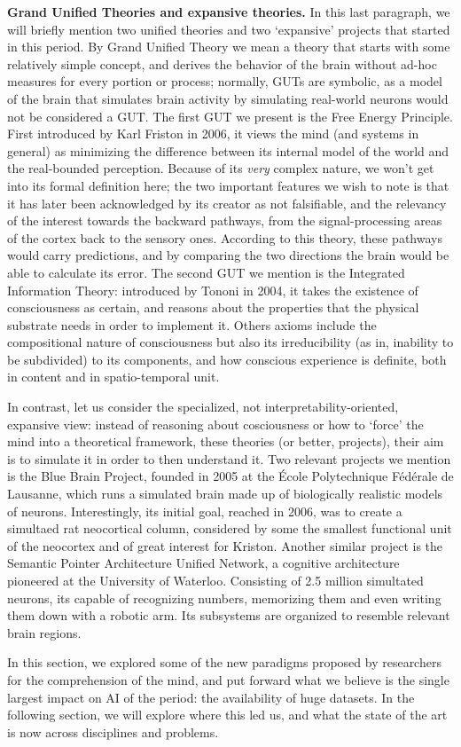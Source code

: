 \documentclass[../main.tex]{subfiles}
\begin{document}
\vspace{4pt}
\textbf{Grand Unified Theories and expansive theories.} In this last paragraph, we will briefly mention two unified theories and two `expansive' projects that started in this period. By Grand Unified Theory we mean a theory that starts with some relatively simple concept, and derives the behavior of the brain without ad-hoc measures for every portion or process; normally, GUTs are symbolic, as a model of the brain that simulates brain activity by simulating real-world neurons would not be considered a GUT. The first GUT we present is the Free Energy Principle. First introduced by Karl Friston in 2006\cite{fristonFreeEnergyPrinciple2006}, it views the mind (and systems in general) as minimizing the difference between its internal model of the world and the real-bounded perception. Because of its \textit{very} complex nature, we won't get into its formal definition here; the two important features we wish to note is that it has later been acknowledged by its creator as not falsifiable, and the relevancy of the interest towards the backward pathways, from the signal-processing areas of the cortex back to the sensory ones. According to this theory, these pathways would carry predictions, and by comparing the two directions the brain would be able to calculate its error. The second GUT we mention is the Integrated Information Theory: introduced by Tononi in 2004\cite{tononiInformationIntegrationTheory2004}, it takes the existence of consciousness as certain, and reasons about the properties that the physical substrate needs in order to implement it. Others axioms include the compositional nature of consciousness but also its irreducibility (as in, inability to be subdivided) to its components, and how conscious experience is definite, both in content and in spatio-temporal unit.

In contrast, let us consider the specialized, not interpretability-oriented, expansive view: instead of reasoning about cosciousness or how to `force' the mind into a theoretical framework, these theories (or better, projects), their aim is to simulate it in order to then understand it. Two relevant projects we mention is the Blue Brain Project, founded in 2005 at the École Polytechnique Fédérale de Lausanne, which runs a  simulated brain made up of biologically realistic models of neurons. Interestingly, its initial goal, reached in 2006, was to create a simultaed rat neocortical column, considered by some the smallest functional unit of the neocortex and of great interest for Kriston. Another similar project is the Semantic Pointer Architecture Unified Network, a cognitive architecture pioneered at the University of Waterloo. Consisting of 2.5 million simultated neurons, its capable of recognizing numbers, memorizing them and even writing them down with a robotic arm. Its subsystems are organized to resemble relevant brain regions.

In this section, we explored some of the new paradigms proposed by researchers for the comprehension of the mind, and put forward what we believe is the single largest impact on AI of the period: the availability of huge datasets. In the following section, we will explore where this led us, and what the state of the art is now across disciplines and problems.
\end{document}
